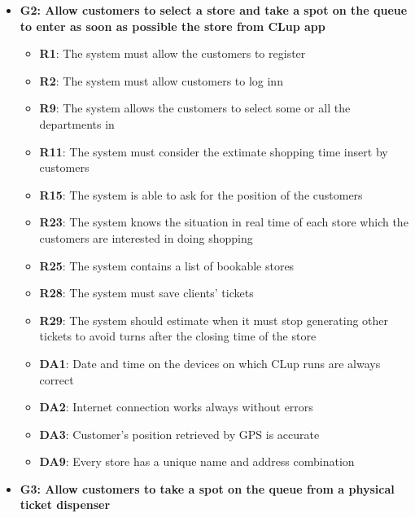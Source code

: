 \documentclass{article}
\begin{document}
\begin{itemize}
				\item {\bfseries G2: Allow customers to select a store and take a spot on the queue to enter as soon as possible the store from CLup app}	

					\begin{itemize}
						
						\item {\bfseries R1}: The system must allow the customers to register
						\item {\bfseries R2}: The system must allow customers to log inn
						\item {\bfseries R9}: The system allows the customers to select some or all the departments in
						\item {\bfseries R11}: The system must consider the extimate shopping time insert by customers
						\item {\bfseries R15}: The system is able to ask for the position of the customers
						\item {\bfseries R23}: The system knows the situation in real time of each store
						which the customers are interested in doing shopping
						\item {\bfseries R25}: The system contains a list of bookable stores
						\item {\bfseries R28}: The system must save clients’ tickets
						\item {\bfseries R29}: The system should estimate when it must stop generating other tickets to avoid turns after the closing time of the store \\
		
						\item {\bfseries DA1}: Date and time on the devices on which CLup runs are always correct
						\item {\bfseries DA2}: Internet connection works always without errors
						\item {\bfseries DA3}: Customer’s position retrieved by GPS is accurate
						\item {\bfseries DA9}: Every store has a unique name and address combination
						
					\end{itemize}

				\item {\bfseries G3: Allow customers to take a spot on the queue from a physical ticket dispenser}	

					\begin{itemize}
						

\end{itemize}
\end{itemize}
\end{document}
